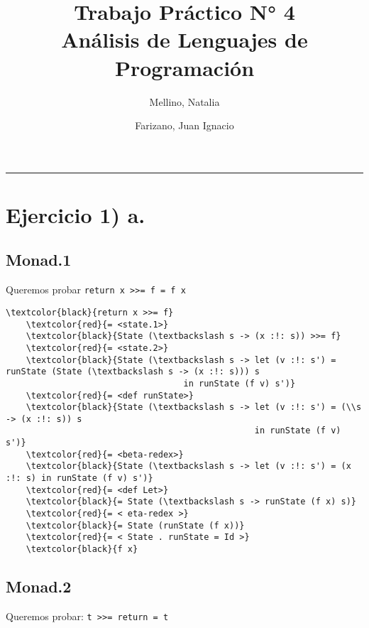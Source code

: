 \documentclass[11pt]{article}
\title{
    Trabajo Práctico N° 4 \\
    \large Análisis de Lenguajes de Programación}
\author{Mellino, Natalia \and Farizano, Juan Ignacio}
\date{}
\begin{document}
\maketitle
\noindent\rule{\textwidth}{1pt}

\section*{Ejercicio 1) a.}

\subsection*{Monad.1}

Queremos probar \texttt{return x >>= f = f x}

\begin{Verbatim}[commandchars=\\\{\}]
    \textcolor{black}{return x >>= f}
    \textcolor{red}{= <state.1>}
    \textcolor{black}{State (\textbackslash s -> (x :!: s)) >>= f}
    \textcolor{red}{= <state.2>}
    \textcolor{black}{State (\textbackslash s -> let (v :!: s') = runState (State (\textbackslash s -> (x :!: s))) s
                                   in runState (f v) s')}
    \textcolor{red}{= <def runState>}
    \textcolor{black}{State (\textbackslash s -> let (v :!: s') = (\\s -> (x :!: s)) s
                                                 in runState (f v) s')}
    \textcolor{red}{= <beta-redex>}
    \textcolor{black}{State (\textbackslash s -> let (v :!: s') = (x :!: s) in runState (f v) s')}
    \textcolor{red}{= <def Let>}
    \textcolor{black}{= State (\textbackslash s -> runState (f x) s)}
    \textcolor{red}{= < eta-redex >}
    \textcolor{black}{= State (runState (f x))}
    \textcolor{red}{= < State . runState = Id >}
    \textcolor{black}{f x}
\end{Verbatim}

\subsection*{Monad.2}

Queremos probar: \texttt{t >>= return     = t}
\end{document}
